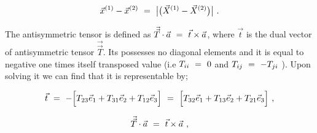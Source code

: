 \documentclass{article}
\newcounter{subsubsubsection}[subsubsection]
\begin{document}
\begin{equation} \label{eq:1}
\vec{x}^{(1)} - \vec{x}^{(2)} \hspace{0.125cm} = \hspace{0.125cm} \big| \big( \vec{X}^{(1)} - \vec{X}^{(2)} \big) \big| \hspace{0.125cm} .
\end{equation}


The antisymmetric tensor is defined as \begin{math} \vec{\vec{T}} \cdot \vec{a}  \hspace{0.125cm} = \hspace{0.125cm} \vec{t} \times \vec{a} \end{math}, where \begin{math} \vec{t} \end{math} is the dual vector of antisymmetric tensor \begin{math} \vec{\vec{T}} \end{math}. Its possesses no diagonal elements and it is equal to negative one times itself transposed value (i.e  \begin{math} T_{i i} \hspace{0.125cm} = \hspace{0.125cm} 0 \end{math} and \begin{math} T_{i j} \hspace{0.125cm} = \hspace{0.125cm} - T_{j i}  \end{math} ). Upon solving it we can find that it is representable by;

\begin{equation} \label{eq:1}
\vec{t}  \hspace{0.125cm} = \hspace{0.125cm} - \Big[ T_{2 3} \vec{e}_1 + T_{3 1} \vec{e}_2 + T_{1 2} \vec{e}_3  \Big]  \hspace{0.125cm} = \hspace{0.125cm} \Big[ T_{3 2} \vec{e}_1 + T_{1 3} \vec{e}_2 + T_{2 1} \vec{e}_3  \Big] \hspace{0.125cm} , 
\end{equation}


\begin{equation} \label{eq:1}
\vec{\vec{T}} \cdot \vec{a} \hspace{0.125cm} = \hspace{0.125cm} \vec{t} \times \vec{a} \hspace{0.125cm} , 
\end{equation}
\end{document}
